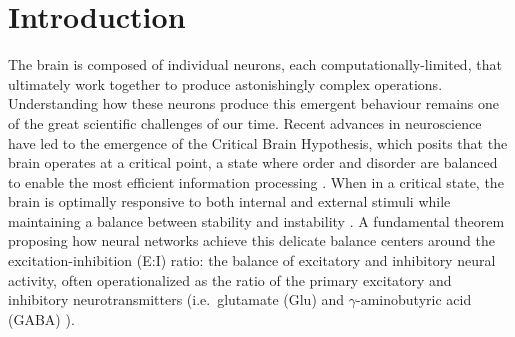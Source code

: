 \documentclass[
true
]{sn-jnl}
\begin{document}
\section{Introduction}\label{introduction}

The brain is composed of individual neurons, each
computationally-limited, that ultimately work together to produce
astonishingly complex operations. Understanding how these neurons
produce this emergent behaviour remains one of the great scientific
challenges of our time. Recent advances in neuroscience have led to the
emergence of the Critical Brain Hypothesis, which posits that the brain
operates at a critical point, a state where order and disorder are
balanced to enable the most efficient information processing
\citep{decoRestingBrainsNever2013, beggsBeingCriticalCriticality2012, barangerChaosComplexityEntropy2000, bassettUnderstandingComplexityHuman2011, zimmernWhyBrainCriticality2020, liangExcitationInhibitionBalance2024, poilCriticalStateDynamicsAvalanches2012, lombardiBalanceExcitationInhibition2017, baumgartenCriticalExcitationinhibitionBalance2019, bruiningMeasurementExcitationinhibitionRatio2020, trakoshisIntrinsicExcitationinhibitionImbalance, gaoInferringSynapticExcitation2017, tianTheoreticalFoundationsStudying2022, rubinovNeurobiologicallyRealisticDeterminants2011}.
When in a critical state, the brain is optimally responsive to both
internal and external stimuli while maintaining a balance between
stability and instability
\citep{decoRestingBrainsNever2013, beggsBeingCriticalCriticality2012, tianTheoreticalFoundationsStudying2022, rubinovNeurobiologicallyRealisticDeterminants2011}.
A fundamental theorem proposing how neural networks achieve this
delicate balance centers around the excitation-inhibition (E:I) ratio:
the balance of excitatory and inhibitory neural activity, often
operationalized as the ratio of the primary excitatory and inhibitory
neurotransmitters (i.e.~glutamate (Glu) and \(\gamma\)-aminobutyric acid
(GABA)
\citep{liangExcitationInhibitionBalance2024, lombardiBalanceExcitationInhibition2017, baumgartenCriticalExcitationinhibitionBalance2019, bruiningMeasurementExcitationinhibitionRatio2020, trakoshisIntrinsicExcitationinhibitionImbalance, gaoInferringSynapticExcitation2017}).
\end{document}
